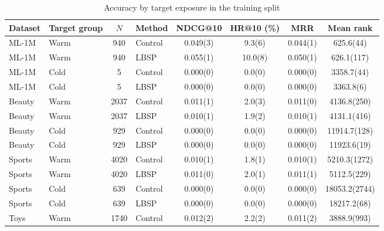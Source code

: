 \begin{table}[!htbp]
\centering
\caption{Accuracy by target exposure in the training split}
\label{tab:x7-target-accuracy}
\fontsize{8.5}{11}\selectfont
\setlength{\tabcolsep}{1.6pt}
\renewcommand{\arraystretch}{1.15}
\begin{tabular*}{\textwidth}{@{\extracolsep{\fill}}llS[table-format=4.0]lS[table-format=1.3(3)]S[table-format=2.1(3)]S[table-format=1.3(3)]S[table-format=5.1(5)]@{}}
\toprule
Dataset & Target group & {$N$} & Method & {NDCG@10} & {HR@10 (\%)} & {MRR} & {Mean rank}\\
\midrule
ML-1M & Warm & 940 & Control & 0.049(3) & 9.3(6) & 0.044(1) & 625.6(44)\\ %
ML-1M & Warm & 940 & LBSP & 0.055(1) & 10.0(8) & 0.050(1) & 626.1(117)\\ %
ML-1M & Cold & 5 & Control & 0.000(0) & 0.0(0) & 0.000(0) & 3358.7(44)\\ %
ML-1M & Cold & 5 & LBSP & 0.000(0) & 0.0(0) & 0.000(0) & 3363.8(6)\\ %
\midrule
Beauty & Warm & 2037 & Control & 0.011(1) & 2.0(3) & 0.011(0) & 4136.8(250)\\ %
Beauty & Warm & 2037 & LBSP & 0.010(1) & 1.9(2) & 0.010(1) & 4131.1(416)\\ %
Beauty & Cold & 929 & Control & 0.000(0) & 0.0(0) & 0.000(0) & 11914.7(128)\\ %
Beauty & Cold & 929 & LBSP & 0.000(0) & 0.0(0) & 0.000(0) & 11923.6(19)\\ %
\midrule
Sports & Warm & 4020 & Control & 0.010(1) & 1.8(1) & 0.010(1) & 5210.3(1272)\\ %
Sports & Warm & 4020 & LBSP & 0.011(0) & 2.0(1) & 0.011(1) & 5112.5(229)\\ %
Sports & Cold & 639 & Control & 0.000(0) & 0.0(0) & 0.000(0) & 18053.2(2744)\\ %
Sports & Cold & 639 & LBSP & 0.000(0) & 0.0(0) & 0.000(0) & 18217.2(68)\\ %
\midrule
Toys & Warm & 1740 & Control & 0.012(2) & 2.2(2) & 0.011(2) & 3888.9(993)\\ %

\end{tabular*}
\end{table}
